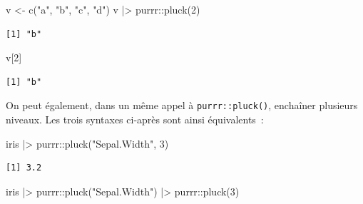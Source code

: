\documentclass[
  letterpaper,
  DIV=11,
  numbers=noendperiod,
  oneside]{scrreprt}
\newenvironment{Shaded}{\begin{snugshade}}{\end{snugshade}}
\newcommand{\DecValTok}[1]{\textcolor[rgb]{0.68,0.00,0.00}{#1}}
\newcommand{\FunctionTok}[1]{\textcolor[rgb]{0.28,0.35,0.67}{#1}}
\newcommand{\NormalTok}[1]{\textcolor[rgb]{0.00,0.23,0.31}{#1}}
\newcommand{\OtherTok}[1]{\textcolor[rgb]{0.00,0.23,0.31}{#1}}
\newcommand{\SpecialCharTok}[1]{\textcolor[rgb]{0.37,0.37,0.37}{#1}}
\newcommand{\StringTok}[1]{\textcolor[rgb]{0.13,0.47,0.30}{#1}}
\begin{document}
\begin{Shaded}
\begin{Highlighting}[]
\NormalTok{v }\OtherTok{\textless{}{-}} \FunctionTok{c}\NormalTok{(}\StringTok{"a"}\NormalTok{, }\StringTok{"b"}\NormalTok{, }\StringTok{"c"}\NormalTok{, }\StringTok{"d"}\NormalTok{)}
\NormalTok{v }\SpecialCharTok{|\textgreater{}}\NormalTok{ purrr}\SpecialCharTok{::}\FunctionTok{pluck}\NormalTok{(}\DecValTok{2}\NormalTok{)}
\end{Highlighting}
\end{Shaded}

\begin{verbatim}
[1] "b"
\end{verbatim}

\begin{Shaded}
\begin{Highlighting}[]
\NormalTok{v[}\DecValTok{2}\NormalTok{]}
\end{Highlighting}
\end{Shaded}

\begin{verbatim}
[1] "b"
\end{verbatim}

On peut également, dans un même appel à \texttt{purrr::pluck()},
enchaîner plusieurs niveaux. Les trois syntaxes ci-après sont ainsi
équivalents~:

\begin{Shaded}
\begin{Highlighting}[]
\NormalTok{iris }\SpecialCharTok{|\textgreater{}} 
\NormalTok{  purrr}\SpecialCharTok{::}\FunctionTok{pluck}\NormalTok{(}\StringTok{"Sepal.Width"}\NormalTok{, }\DecValTok{3}\NormalTok{)}
\end{Highlighting}
\end{Shaded}

\begin{verbatim}
[1] 3.2
\end{verbatim}

\begin{Shaded}
\begin{Highlighting}[]
\NormalTok{iris }\SpecialCharTok{|\textgreater{}} 
\NormalTok{  purrr}\SpecialCharTok{::}\FunctionTok{pluck}\NormalTok{(}\StringTok{"Sepal.Width"}\NormalTok{) }\SpecialCharTok{|\textgreater{}} 
\NormalTok{  purrr}\SpecialCharTok{::}\FunctionTok{pluck}\NormalTok{(}\DecValTok{3}\NormalTok{)}
\end{Highlighting}
\end{Shaded}
\end{document}
